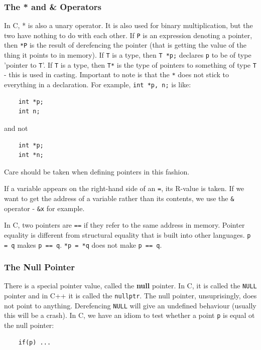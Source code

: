 \documentclass{article}
\begin{document}
	\subsubsection{The * and \& Operators}
	In C, * is also a unary operator. It is also used for binary multiplication, but the two have nothing to do with each other. If \texttt{P} is an expression denoting a pointer, then \texttt{*P} is the result of derefencing the pointer (that is getting the value of the thing it points to in memory). If \texttt{T} is a type, then \texttt{T *p;} declares \texttt{p} to be of type 'pointer to \texttt{T}'. If \texttt{T} is a type, then \texttt{T*} is the type of pointers to something of type \texttt{T} - this is used in casting. Important to note is that the \texttt{*} does not stick to everything in a declaration. For example, \texttt{int *p, n;} is like:
	
	\begin{verbatim}
	int *p;
	int n;
	\end{verbatim}
	
	and not
	
	\begin{verbatim}
	int *p;
	int *n;
	\end{verbatim}
	
	Care should be taken when defining pointers in this fashion.	
	
	\par 
	If a variable appears on the right-hand side of an \texttt{=}, its R-value is taken. If we want to get the address of a variable rather than its contents, we use the \texttt{\&} operator - \texttt{\&x} for example.
	
	\par 
	In C, two pointers are \texttt{==} if they refer to the same address in memory. Pointer equality is different from structural equality that is built into other languages. \texttt{p = q}  makes \texttt{p == q}. \texttt{*p = *q} does not make \texttt{p == q}.
	
	\subsubsection{The Null Pointer}
	There is a special pointer value, called the \textbf{null} pointer. In C, it is called the \texttt{NULL} pointer and in C++ it is called the \texttt{nullptr}. The null pointer, unsuprisingly, does not point to anything. Derefencing \texttt{NULL} will give an undefined behaviour (usually this will be a crash). In C, we have an idiom to test whether a point \texttt{p} is equal ot the null pointer:
	\begin{verbatim}
	if(p) ...
	\end{verbatim}
	
\end{document}
